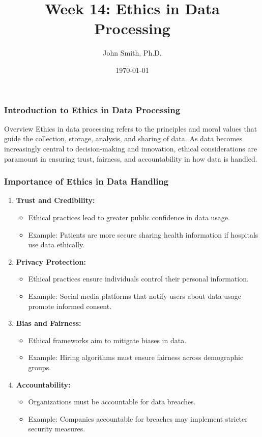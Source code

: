 \documentclass[aspectratio=169]{beamer}
\title[Ethics in Data Processing]{Week 14: Ethics in Data Processing}
\author[J. Smith]{John Smith, Ph.D.}
\institute[University Name]{
  Department of Computer Science\\
  University Name\\
  Email: email@university.edu\\
  Website: www.university.edu
}
\date{\today}
\begin{document}
\frame{\titlepage}

\begin{frame}[fragile]
    \frametitle{Introduction to Ethics in Data Processing}
    \begin{block}{Overview}
        Ethics in data processing refers to the principles and moral values that guide the collection, storage, analysis, and sharing of data. As data becomes increasingly central to decision-making and innovation, ethical considerations are paramount in ensuring trust, fairness, and accountability in how data is handled.
    \end{block}
\end{frame}

\begin{frame}[fragile]
    \frametitle{Importance of Ethics in Data Handling}
    \begin{enumerate}
        \item \textbf{Trust and Credibility:}
        \begin{itemize}
            \item Ethical practices lead to greater public confidence in data usage.
            \item Example: Patients are more secure sharing health information if hospitals use data ethically.
        \end{itemize}
        
        \item \textbf{Privacy Protection:}
        \begin{itemize}
            \item Ethical practices ensure individuals control their personal information.
            \item Example: Social media platforms that notify users about data usage promote informed consent.
        \end{itemize}
        
        \item \textbf{Bias and Fairness:}
        \begin{itemize}
            \item Ethical frameworks aim to mitigate biases in data.
            \item Example: Hiring algorithms must ensure fairness across demographic groups.
        \end{itemize}
        
        \item \textbf{Accountability:}
        \begin{itemize}
            \item Organizations must be accountable for data breaches.
            \item Example: Companies accountable for breaches may implement stricter security measures.
        \end{itemize}
    \end{enumerate}
\end{frame}
\end{document}

